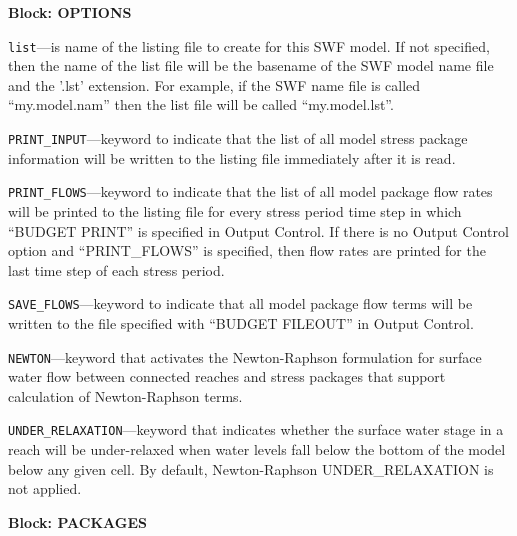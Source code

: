 
\item \textbf{Block: OPTIONS}

\begin{description}
\item \texttt{list}---is name of the listing file to create for this SWF model.  If not specified, then the name of the list file will be the basename of the SWF model name file and the '.lst' extension.  For example, if the SWF name file is called ``my.model.nam'' then the list file will be called ``my.model.lst''.

\item \texttt{PRINT\_INPUT}---keyword to indicate that the list of all model stress package information will be written to the listing file immediately after it is read.

\item \texttt{PRINT\_FLOWS}---keyword to indicate that the list of all model package flow rates will be printed to the listing file for every stress period time step in which ``BUDGET PRINT'' is specified in Output Control.  If there is no Output Control option and ``PRINT\_FLOWS'' is specified, then flow rates are printed for the last time step of each stress period.

\item \texttt{SAVE\_FLOWS}---keyword to indicate that all model package flow terms will be written to the file specified with ``BUDGET FILEOUT'' in Output Control.

\item \texttt{NEWTON}---keyword that activates the Newton-Raphson formulation for surface water flow between connected reaches and stress packages that support calculation of Newton-Raphson terms.

\item \texttt{UNDER\_RELAXATION}---keyword that indicates whether the surface water stage in a reach will be under-relaxed when water levels fall below the bottom of the model below any given cell. By default, Newton-Raphson UNDER\_RELAXATION is not applied.

\end{description}
\item \textbf{Block: PACKAGES}

